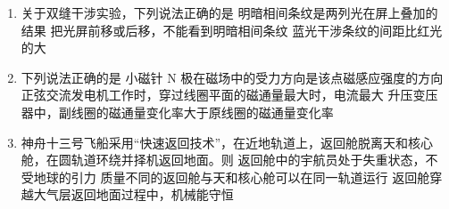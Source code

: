 \documentclass[\gkver]{gaokaozhenti}
\begin{document}
\begin{enumerate}
{	BC．鱼儿摆尾出水时排开水的体积变小，浮力变小，鱼儿能够出水的主要原因是鱼儿摆尾时水对鱼向上的作用力大于重力，B 错误、C 正确；

	D．研究鱼儿摆尾击水跃出水面的动作不可以把鱼儿视为质点，否则就无动作可言，D 错误。

	故选 C。
}

\item
关于双缝干涉实验，下列说法正确的是
{明暗相间条纹是两列光在屏上叠加的结果}
{把光屏前移或后移，不能看到明暗相间条纹}
{蓝光干涉条纹的间距比红光的大}


\item
下列说法正确的是
{小磁针 N 极在磁场中的受力方向是该点磁感应强度的方向}
{正弦交流发电机工作时，穿过线圈平面的磁通量最大时，电流最大}
{升压变压器中，副线圈的磁通量变化率大于原线圈的磁通量变化率}


\item
神舟十三号飞船采用“快速返回技术”，在近地轨道上，返回舱脱离天和核心舱，在圆轨道环绕并择机返回地面。则
{返回舱中的宇航员处于失重状态，不受地球的引力}
{质量不同的返回舱与天和核心舱可以在同一轨道运行}
{返回舱穿越大气层返回地面过程中，机械能守恒}


\end{enumerate}
\end{document}
